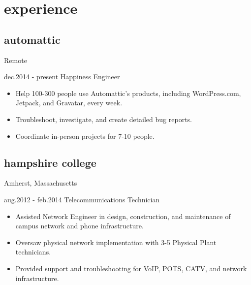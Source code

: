 \documentclass[]{friggeri-cv} %
\begin{document}
\section{experience}
\subsection
{automattic}
{Remote}

\begin{entrylist}
\entry
{dec.2014 - present}
{Happiness Engineer}{}
{\begin{itemize}[leftmargin=*,topsep=0pt]
\item Help 100-300 people use Automattic’s products, including WordPress.com, Jetpack, and Gravatar, every week.
\item Troubleshoot, investigate, and create detailed bug reports.
\item Coordinate in-person projects for 7-10 people.
\end{itemize}}
\end{entrylist}
\subsection
{hampshire college}
{Amherst, Massachusetts}

\begin{entrylist}
\entry
{aug.2012 - feb.2014}
{Telecommunications Technician}{}
{\begin{itemize}[leftmargin=*,topsep=0pt]
\item Assisted Network Engineer in design, construction, and maintenance of campus network and phone infrastructure.
\item Oversaw physical network implementation with 3-5 Physical Plant technicians.
\item Provided support and troubleshooting for VoIP, POTS, CATV, and network infrastructure.
\end{itemize}}
\end{entrylist}

\vspace{-1\parskip}
\end{document}
